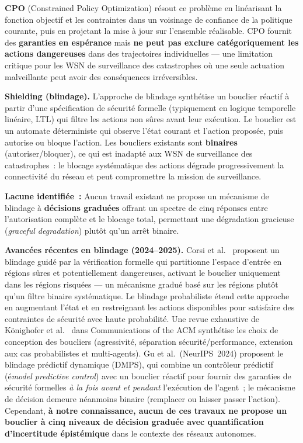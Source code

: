 \textbf{CPO} (Constrained Policy Optimization) \cite{achiam2017cpo} résout ce problème en linéarisant la fonction objectif et les contraintes dans un voisinage de confiance de la politique courante, puis en projetant la mise à jour sur l'ensemble réalisable. CPO fournit des \textbf{garanties en espérance} mais \textbf{ne peut pas exclure catégoriquement les actions dangereuses} dans des trajectoires individuelles --- une limitation critique pour les WSN de surveillance des catastrophes où une seule actuation malveillante peut avoir des conséquences irréversibles.

\textbf{Shielding (blindage).} L'approche de blindage \cite{alshiekh2018shielding} synthétise un bouclier réactif à partir d'une spécification de sécurité formelle (typiquement en logique temporelle linéaire, LTL) qui filtre les actions non sûres avant leur exécution. Le bouclier est un automate déterministe qui observe l'état courant et l'action proposée, puis autorise ou bloque l'action. Les boucliers existants sont \textbf{binaires} (autoriser/bloquer), ce qui est inadapté aux WSN de surveillance des catastrophes~: le blocage systématique des actions dégrade progressivement la connectivité du réseau et peut compromettre la mission de surveillance.

\textbf{Lacune identifiée~:} Aucun travail existant ne propose un mécanisme de blindage à \textbf{décisions graduées} offrant un spectre de cinq réponses entre l'autorisation complète et le blocage total, permettant une dégradation gracieuse (\emph{graceful degradation}) plutôt qu'un arrêt binaire.

\textbf{Avancées récentes en blindage (2024--2025).} Corsi et al.\ \cite{corsi2024verification} proposent un blindage guidé par la vérification formelle qui partitionne l'espace d'entrée en régions sûres et potentiellement dangereuses, activant le bouclier uniquement dans les régions risquées --- un mécanisme gradué basé sur les régions plutôt qu'un filtre binaire systématique. Le blindage probabiliste \cite{corsi2025prob_shielding} étend cette approche en augmentant l'état et en restreignant les actions disponibles pour satisfaire des contraintes de sécurité avec haute probabilité. Une revue exhaustive de Könighofer et al.\ \cite{pranger2025shields} dans Communications of the ACM synthétise les choix de conception des boucliers (agressivité, séparation sécurité/performance, extension aux cas probabilistes et multi-agents). Gu et al.\ (NeurIPS~2024) \cite{dmps_shielding2024} proposent le blindage prédictif dynamique (DMPS), qui combine un contrôleur prédictif (é\emph{model predictive control}) avec un bouclier réactif pour fournir des garanties de sécurité formelles \emph{à la fois avant et pendant} l'exécution de l'agent~; le mécanisme de décision demeure néanmoins binaire (remplacer ou laisser passer l'action). Cependant, \textbf{à notre connaissance, aucun de ces travaux ne propose un bouclier à cinq niveaux de décision graduée avec quantification d'incertitude épistémique} dans le contexte des réseaux autonomes.

